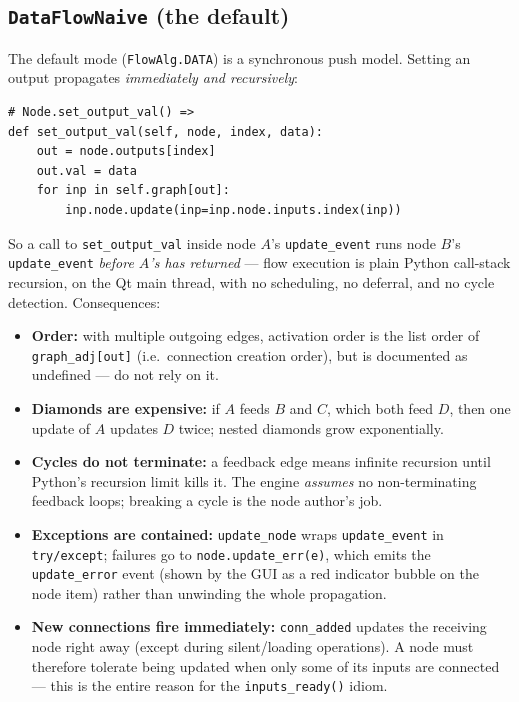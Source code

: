 \documentclass[10pt,a4paper]{article}
\newcommand{\code}[1]{\texttt{\small #1}}
\begin{document}
\subsection{\texttt{DataFlowNaive} (the default)}

The default mode (\code{FlowAlg.DATA}) is a synchronous push model.
Setting an output propagates \emph{immediately and recursively}:

\begin{lstlisting}
# Node.set_output_val() =>
def set_output_val(self, node, index, data):
    out = node.outputs[index]
    out.val = data
    for inp in self.graph[out]:
        inp.node.update(inp=inp.node.inputs.index(inp))
\end{lstlisting}

So a call to \code{set\_output\_val} inside node $A$'s \code{update\_event} runs node
$B$'s \code{update\_event} \emph{before $A$'s has returned} --- flow execution is plain
Python call-stack recursion, on the Qt main thread, with no scheduling, no deferral,
and no cycle detection. Consequences:

\begin{itemize}
\item \textbf{Order:} with multiple outgoing edges, activation order is the list order
      of \code{graph\_adj[out]} (i.e.\ connection creation order), but is documented as
      undefined --- do not rely on it.
\item \textbf{Diamonds are expensive:} if $A$ feeds $B$ and $C$, which both feed $D$,
      then one update of $A$ updates $D$ twice; nested diamonds grow exponentially.
\item \textbf{Cycles do not terminate:} a feedback edge means infinite recursion until
      Python's recursion limit kills it. The engine \emph{assumes} no non-terminating
      feedback loops; breaking a cycle is the node author's job.
\item \textbf{Exceptions are contained:} \code{update\_node} wraps
      \code{update\_event} in \code{try/except}; failures go to
      \code{node.update\_err(e)}, which emits the \code{update\_error} event (shown by
      the GUI as a red indicator bubble on the node item) rather than unwinding the
      whole propagation.
\item \textbf{New connections fire immediately:} \code{conn\_added} updates the
      receiving node right away (except during silent/loading operations). A node must
      therefore tolerate being updated when only some of its inputs are connected ---
      this is the entire reason for the \code{inputs\_ready()} idiom.
\end{itemize}
\end{document}
